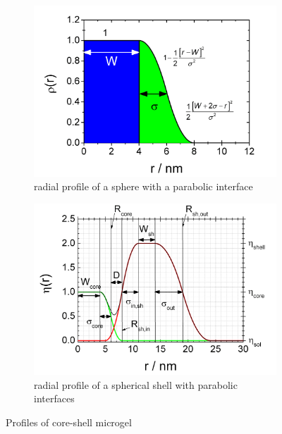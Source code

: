 \begin{figure}[htb]
\begin{subfigure}[b]{.48\textwidth}
   \centering
   \includegraphics[width=1\textwidth]{../images/form_factor/FuzzySphere/CoreShellMicrogel1.png}
   \caption{radial profile of a sphere with a parabolic interface}
   \label{fig:profile:CoreShellMicrogel1}
\end{subfigure}
\hfill
\begin{subfigure}[b]{.48\textwidth}
   \centering
   \includegraphics[width=1\textwidth]{../images/form_factor/FuzzySphere/CoreShellMicrogel2.png}
   \caption{radial profile of a spherical shell with parabolic interfaces}
   \label{fig:profile:CoreShellMicrogel2}
\end{subfigure}
\caption{Profiles of core-shell microgel}
\label{fig:profile:CoreShellMicrogel}
\end{figure}


